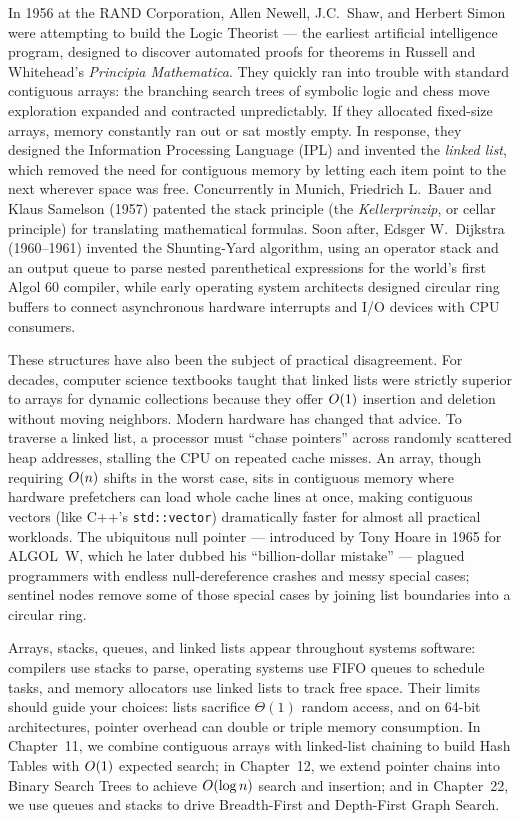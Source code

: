 \begin{historybox}
In 1956 at the RAND Corporation, Allen Newell, J.C.\ Shaw, and Herbert Simon were attempting to
build the Logic Theorist --- the earliest artificial intelligence program, designed to discover
automated proofs for theorems in Russell and Whitehead's \emph{Principia Mathematica}. They quickly
ran into trouble with standard contiguous arrays: the branching search trees of symbolic logic and
chess move exploration expanded and contracted unpredictably. If they allocated fixed-size arrays,
memory constantly ran out or sat mostly empty. In response, they designed the Information Processing
Language (IPL) and invented the \emph{linked list}, which removed the need for
contiguous memory by letting each item point to the next wherever space was free. Concurrently in
Munich, Friedrich L.\ Bauer and Klaus Samelson (1957) patented the stack principle (the
\emph{Kellerprinzip}, or cellar principle) for translating mathematical formulas. Soon after, Edsger
W.\ Dijkstra (1960--1961) invented the Shunting-Yard algorithm, using an operator stack and an
output queue to parse nested parenthetical expressions for the world's first Algol 60 compiler, while
early operating system architects designed circular ring buffers to connect asynchronous hardware
interrupts and I/O devices with CPU consumers.

These structures have also been the subject of practical disagreement. For
decades, computer science textbooks taught that linked lists were strictly superior to arrays for
dynamic collections because they offer $O(1)$ insertion and deletion without moving neighbors.
Modern hardware has changed that advice. To traverse a linked list, a
processor must ``chase pointers'' across randomly scattered heap addresses, stalling the CPU on
repeated cache misses. An array, though requiring $O(n)$ shifts in the worst case, sits in
contiguous memory where hardware prefetchers can load whole cache lines at once, making contiguous
vectors (like C++'s \lstinline|std::vector|) dramatically faster for almost all practical workloads.
The ubiquitous null pointer --- introduced by Tony Hoare in 1965 for ALGOL~W, which he
later dubbed his ``billion-dollar mistake'' --- plagued programmers with endless null-dereference
crashes and messy special cases; sentinel nodes remove some of those special cases by joining list
boundaries into a circular ring.

Arrays, stacks, queues, and linked lists appear throughout
systems software: compilers use stacks to parse, operating systems use FIFO queues to schedule
tasks, and memory allocators use linked lists to track free space. Their
limits should guide your choices: lists sacrifice $\Theta(1)$ random access, and on
64-bit architectures, pointer overhead can double or triple memory consumption. In Chapter~11, we
combine contiguous arrays with linked-list chaining to build Hash Tables with $O(1)$ expected
search; in Chapter~12, we extend pointer chains into Binary Search Trees to achieve
$O(\log n)$ search and insertion; and in Chapter~22, we use queues and stacks to drive
Breadth-First and Depth-First Graph Search.
\end{historybox}

